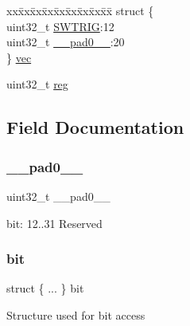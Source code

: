 \begin{DoxyCompactItemize}
\begin{tabbing}
\end{tabbing}\item 
\begin{tabbing}
xx\=xx\=xx\=xx\=xx\=xx\=xx\=xx\=xx\=\kill
struct \{\\
\>uint32\_t \mbox{\hyperlink{union_d_m_a_c___s_w_t_r_i_g_c_t_r_l___type_a1102380e0901a557df97095aef2b46e3}{SWTRIG}}:12\\
\>uint32\_t \mbox{\hyperlink{union_d_m_a_c___s_w_t_r_i_g_c_t_r_l___type_a3e57c2ef1c3ffb36722f000cc1156824}{\_\_pad0\_\_}}:20\\
\} \mbox{\hyperlink{union_d_m_a_c___s_w_t_r_i_g_c_t_r_l___type_a176d4a9dee328a9fcc5bb981cb53de76}{vec}}\\

\end{tabbing}\item 
uint32\+\_\+t \mbox{\hyperlink{union_d_m_a_c___s_w_t_r_i_g_c_t_r_l___type_a6b91636401516a477989a336376d7b40}{reg}}
\end{DoxyCompactItemize}


\subsection{Field Documentation}
\mbox{\label{union_d_m_a_c___s_w_t_r_i_g_c_t_r_l___type_a3e57c2ef1c3ffb36722f000cc1156824}} 
\subsubsection{\texorpdfstring{\_\_pad0\_\_}{\_\_pad0\_\_}}
{\footnotesize\ttfamily uint32\+\_\+t \+\_\+\+\_\+pad0\+\_\+\+\_\+}

bit\+: 12..31 Reserved \mbox{\label{union_d_m_a_c___s_w_t_r_i_g_c_t_r_l___type_a7c18efe3e13e9f26fbc952c3bd890d85}} 
\subsubsection{\texorpdfstring{bit}{bit}}
{\footnotesize\ttfamily struct \{ ... \}   bit}

Structure used for bit access \mbox{\label{union_d_m_a_c___s_w_t_r_i_g_c_t_r_l___type_a6b91636401516a477989a336376d7b40}} 
